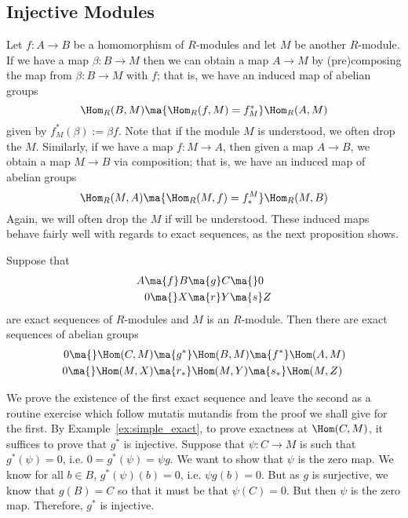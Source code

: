 \subsection{Injective Modules}


Let $f: A \to B$ be a homomorphism of $R$-modules and let $M$ be another $R$-module. If we have a map $\beta: B \to M$ then we can obtain a map $A \to M$ by (pre)composing the map from $\beta: B \to M$ with $f$; that is, we have an induced map of abelian groups
        \[
        \Hom_R(B,M) \ma{\Hom_R(f,M)=f_M^*} \Hom_R(A,M)
        \]
given by $f_M^*(\beta):=\beta f$. Note that if the module $M$ is understood, we often drop the $M$. Similarly, if we have a map $f: M \to A$, then given a map $A \to B$, we obtain a map $M \to B$ via composition; that is, we have an induced map of abelian groups
	\[
	\Hom_R(M,A) \ma{\Hom_R(M,f)= f_*^M} \Hom_R(M,B)
	\]
Again, we will often drop the $M$ if will be understood. These induced maps behave fairly well with regards to exact sequences, as the next proposition shows. 


\begin{prop}
Suppose that
	\[
	\begin{split}
	A \ma{f} B &\ma{g} C \ma{} 0 \\
	0 \ma{} X &\ma{r} Y \ma{s} Z
	\end{split}
	\]
are exact sequences of $R$-modules and $M$ is an $R$-module. Then there are exact sequences of abelian groups
	\[
	\begin{split}
	0 \ma{} \Hom(C,M) &\ma{g^*} \Hom(B,M) \ma{f^*} \Hom(A,M) \\
	0 \ma{} \Hom(M,X) &\ma{r_*} \Hom(M,Y) \ma{s_*} \Hom(M,Z) 
	\end{split}
	\]
\end{prop}

\pf  We prove the existence of the first exact sequence and leave the second as a routine exercise which follow mutatis mutandis from the proof we shall give for the first. By Example~\ref{ex:simple_exact}, to prove exactness at $\Hom(C,M)$, it suffices to prove that $g^*$ is injective. Suppose that $\psi: C \to M$ is such that $g^*(\psi)= 0$, i.e. $0= g^*(\psi)= \psi g$. We want to show that $\psi$ is the zero map. We know for all $b \in B$, $g^*(\psi)(b)=0$, i.e. $\psi g(b)= 0$. But as $g$ is surjective, we know that $g(B)= C$ so that it must be that $\psi(C)= 0$. But then $\psi$ is the zero map. Therefore, $g^*$ is injective. 

